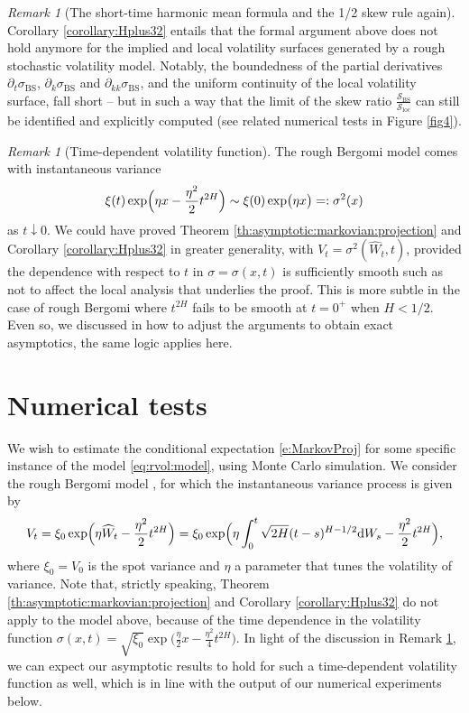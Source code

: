 \documentclass[11pt]{article}
\theoremstyle{plain}
\theoremstyle{definition}
\theoremstyle{remark}
\newtheorem{remark}[theorem]{Remark}
\newcommand{\be}{\beta}
\renewcommand{\hat}{\widehat}
\newcommand{\dd}{\mathrm{d}}
\newcommand{\1}{\mathbf{1}}
\newcommand{\Sbs}{\mathcal{S}_\mathrm{BS}}
\newcommand{\Sloc}{\mathcal{S}_\mathrm{loc}}
\numberwithin{equation}{section}
\def\be{\begin{equation}}
\def\ee{\end{equation}}
\def\sigBS{\sigma_\mathrm{BS}}
\begin{document}
\begin{remark}[The short-time harmonic mean formula and the 1/2 skew rule again]
Corollary \ref{corollary:Hplus32} entails that the formal argument above does not hold anymore for the implied and local volatility surfaces generated by a rough stochastic volatility model. 
Notably, the boundedness of the partial derivatives $\partial_t \sigBS$, $\partial_k \sigBS$ and $\partial_{kk} \sigBS$, and the uniform continuity of the local volatility surface, fall short -- but in such a way that the limit of the skew ratio $\frac{\Sbs}{\Sloc}$ can still be identified and explicitly computed (see related numerical tests in Figure \ref{fig4}).
\end{remark}

\begin{remark}[Time-dependent volatility function] \label{rm:timedependence}
The rough Bergomi model \cite{bayer2016pricing} comes with instantaneous variance
\[
\xi (t)  \exp \Bigl(\eta x - \frac{\eta^2}2	t^{2 H} \Bigr) \sim \xi (0)  \exp \bigl(\eta x  \bigr) =: \sigma^{2}(x)
\]
as $t \downarrow 0$. We could have proved Theorem \ref{th:asymptotic:markovian:projection} and Corollary \ref{corollary:Hplus32} in greater generality, with $V_t = \sigma^2(\hat{W}_t, t)$, provided the dependence with respect to $t$ in $\sigma = \sigma(x,t)$ is sufficiently smooth such as not to affect the local analysis that underlies the proof. %
This is more subtle in the case of rough Bergomi where $t^{2H}$ fails to be smooth at $t=0^+$ when $H<1/2$.
Even so, we discussed in \cite{friz2018precise1} how to adjust the arguments to obtain exact asymptotics, the same logic applies here.
\end{remark}

\section{Numerical tests}\label{sec:num}

\noindent We wish to estimate the conditional expectation \eqref{e:MarkovProj} for some specific instance of the model \eqref{eq:rvol:model}, 
using Monte Carlo simulation.
We consider the rough Bergomi model \cite{bayer2016pricing}, for which the instantaneous variance process is given by
\be \label{e:rBergomi}
V_t = \xi_0 \exp \Bigl(\eta \hat W_t - \frac{\eta^2}2	t^{2 H} \Bigr)
=  \xi_0 \exp \Bigl(\eta \int_0^t \sqrt{2H} (t-s)^{H - 1/2} \dd W_s  - \frac{\eta^2}2	t^{2 H} \Bigr),
\ee
where $\xi_0 = V_0$ is the spot variance and $\eta$ a parameter that tunes the volatility of variance.
Note that, strictly speaking, Theorem \ref{th:asymptotic:markovian:projection} and Corollary \ref{corollary:Hplus32} do not apply to the model above,
because of the time dependence in the volatility function $\sigma(x,t) = \sqrt{\xi_0} \exp \bigl(\frac{\eta}{2} x - \frac{\eta^2}4	t^{2 H} \bigr)$.
In light of the discussion in Remark \ref{rm:timedependence}, we can expect our asymptotic results to hold for such a time-dependent volatility function as well, which is
in line with the output of our numerical experiments below.
\end{document}
